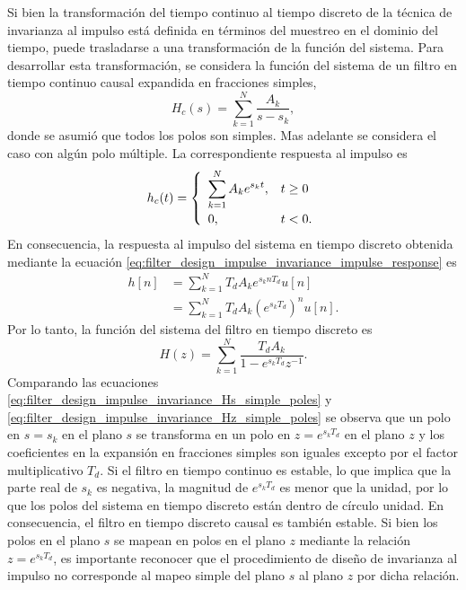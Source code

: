 \documentclass[a4paper]{report}
\begin{document}
Si bien la transformación del tiempo continuo al tiempo discreto de la técnica de invarianza al impulso está definida en términos del muestreo en el dominio del tiempo, puede trasladarse a una transformación de la función del sistema. Para desarrollar esta transformación, se considera la función del sistema de un filtro en tiempo continuo causal expandida en fracciones simples,
\begin{equation}\label{eq:filter_design_impulse_invariance_Hs_simple_poles}
 H_c(s)=\sum_{k=1}^N\frac{A_k}{s-s_k}, 
\end{equation}
donde se asumió que todos los polos son simples. Mas adelante se considera el caso con algún polo múltiple. La correspondiente respuesta al impulso es
\[
 h_c(t)=
 \left\{ 
 \begin{array}{ll}
  \displaystyle\sum_{k=1}^NA_ke^{s_kt}, & t\geq0\\[\bigskipamount]
  0, & t<0.\\
 \end{array}
 \right.
\]
En consecuencia, la respuesta al impulso del sistema en tiempo discreto obtenida mediante la ecuación \ref{eq:filter_design_impulse_invariance_impulse_response} es
\begin{align*}
 h[n]&=\sum_{k=1}^NT_dA_ke^{s_knT_d}u[n]\\
   &=\sum_{k=1}^NT_dA_k(e^{s_kT_d})^nu[n].
\end{align*}
Por lo tanto, la función del sistema del filtro en tiempo discreto es
\begin{equation}\label{eq:filter_design_impulse_invariance_Hz_simple_poles}
 H(z)=\sum_{k=1}^N\frac{T_dA_k}{1-e^{s_kT_d}z^{-1}}. 
\end{equation}
Comparando las ecuaciones \ref{eq:filter_design_impulse_invariance_Hs_simple_poles} y \ref{eq:filter_design_impulse_invariance_Hz_simple_poles} se observa que un polo en \(s=s_k\) en el plano \(s\) se transforma en un polo en \(z=e^{s_kT_d}\) en el plano \(z\) y los coeficientes en la expansión en fracciones simples son iguales excepto por el factor multiplicativo \(T_d\). Si el filtro en tiempo continuo es estable, lo que implica que la parte real de \(s_k\) es negativa, la magnitud de \(e^{s_kT_d}\) es menor que la unidad, por lo que los polos del sistema en tiempo discreto están dentro de círculo unidad. En consecuencia, el filtro en tiempo discreto causal es también estable. Si bien los polos en el plano \(s\) se mapean en polos en el plano \(z\) mediante la relación \(z=e^{s_kT_d}\), es importante reconocer que el procedimiento de diseño de invarianza al impulso no corresponde al mapeo simple del plano \(s\) al plano \(z\) por dicha relación.
\end{document}
